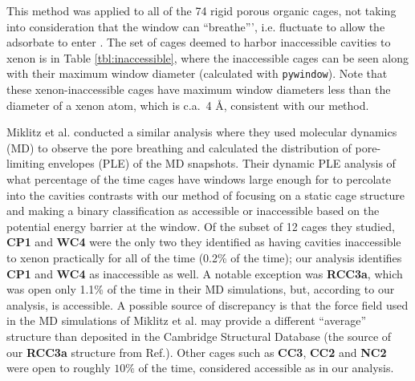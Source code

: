 \documentclass[journal=jacsat,manuscript=article]{achemso}
\begin{document}
{This method was applied to all of the 74 rigid porous organic cages, not taking into consideration that the window can ``breathe''', i.e. fluctuate to allow the adsorbate to enter \cite{miklitz2017computational}. The set of cages deemed to harbor inaccessible cavities to xenon is in Table \ref{tbl:inaccessible}, where the inaccessible cages can be seen along with their maximum window diameter (calculated with \texttt{pywindow}). Note that these xenon-inaccessible cages have maximum window diameters less than the diameter of a xenon atom, which is c.a.\ 4 \AA, consistent with our method. 

Miklitz et al.\cite{miklitz2017computational} conducted a similar analysis where they used molecular dynamics (MD) to observe the pore breathing and calculated the distribution of pore-limiting envelopes (PLE) of the MD snapshots. Their dynamic PLE analysis of what percentage of the time cages have windows large enough for  to percolate into the cavities contrasts with our method of focusing on a static cage structure and making a binary classification as accessible or inaccessible based on the potential energy barrier at the window. Of the subset of 12 cages they studied, \textbf{CP1} and \textbf{WC4} were the only two they identified as having cavities inaccessible to xenon practically for all of the time (0.2\% of the time); our analysis identifies \textbf{CP1} and \textbf{WC4} as inaccessible as well. A notable exception was \textbf{RCC3a}, which was open only 1.1\% of the time in their MD simulations, but, according to our analysis, is accessible. A possible source of discrepancy is that the force field used in the MD simulations of Miklitz et al.\cite{miklitz2017computational} may provide a different ``average'' structure than deposited in the Cambridge Structural Database (the source of our \textbf{RCC3a} structure from Ref.\cite{miklitz2017computational}). Other cages such as \textbf{CC3}, \textbf{CC2} and \textbf{NC2} were open to  roughly $10 \%$ of the time, considered accessible as in our analysis. 

}
\end{document}
